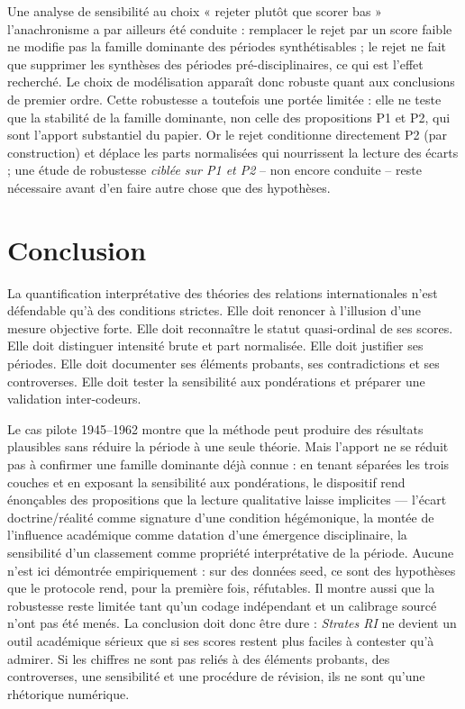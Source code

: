 \documentclass[11pt,a4paper]{article}
\begin{document}
Une analyse de sensibilité au choix « rejeter plutôt que scorer bas » l'anachronisme a par ailleurs été conduite : remplacer le rejet par un score faible ne modifie pas la famille dominante des périodes synthétisables ; le rejet ne fait que supprimer les synthèses des périodes pré-disciplinaires, ce qui est l'effet recherché. Le choix de modélisation apparaît donc robuste quant aux conclusions de premier ordre. Cette robustesse a toutefois une portée limitée : elle ne teste que la stabilité de la famille dominante, non celle des propositions P1 et P2, qui sont l'apport substantiel du papier. Or le rejet conditionne directement P2 (par construction) et déplace les parts normalisées qui nourrissent la lecture des écarts ; une étude de robustesse \emph{ciblée sur P1 et P2} -- non encore conduite -- reste nécessaire avant d'en faire autre chose que des hypothèses.

\section{Conclusion}

La quantification interprétative des théories des relations internationales n'est défendable qu'à des conditions strictes. Elle doit renoncer à l'illusion d'une mesure objective forte. Elle doit reconnaître le statut quasi-ordinal de ses scores. Elle doit distinguer intensité brute et part normalisée. Elle doit justifier ses périodes. Elle doit documenter ses éléments probants, ses contradictions et ses controverses. Elle doit tester la sensibilité aux pondérations et préparer une validation inter-codeurs.

Le cas pilote 1945--1962 montre que la méthode peut produire des résultats plausibles sans réduire la période à une seule théorie. Mais l'apport ne se réduit pas à confirmer une famille dominante déjà connue : en tenant séparées les trois couches et en exposant la sensibilité aux pondérations, le dispositif rend énonçables des propositions que la lecture qualitative laisse implicites --- l'écart doctrine/réalité comme signature d'une condition hégémonique, la montée de l'influence académique comme datation d'une émergence disciplinaire, la sensibilité d'un classement comme propriété interprétative de la période. Aucune n'est ici démontrée empiriquement : sur des données seed, ce sont des hypothèses que le protocole rend, pour la première fois, réfutables. Il montre aussi que la robustesse reste limitée tant qu'un codage indépendant et un calibrage sourcé n'ont pas été menés. La conclusion doit donc être dure : \emph{Strates RI} ne devient un outil académique sérieux que si ses scores restent plus faciles à contester qu'à admirer. Si les chiffres ne sont pas reliés à des éléments probants, des controverses, une sensibilité et une procédure de révision, ils ne sont qu'une rhétorique numérique.
\end{document}
